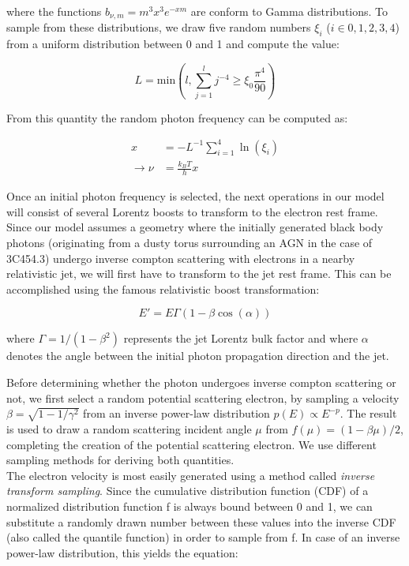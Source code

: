 \documentclass{article}
\begin{document}
        where the functions $b_{\nu,m} = m^3 x^3 e^{-xm}$ are conform to Gamma distributions. To sample from these distributions, we draw five random numbers $\xi_i$ ($i\in{0,1,2,3,4}$) from a uniform distribution between 0 and 1 and compute the value:
        
            \begin{equation}
                L = \mathrm{min}\left( l, \sum_{j=1}^l j^{-4} \geq \xi_0 \frac{\pi^4}{90}\right)
            \end{equation}
        
        From this quantity the random photon frequency can be computed as:

            \begin{align*}
                x &= -L^{-1} \sum_{i=1}^4 \ln(\xi_i) \\
                \longrightarrow \nu &= \frac{k_B T}{h} x
            \end{align*}

        Once an initial photon frequency is selected, the next operations in our model will consist of several Lorentz boosts to transform to the electron rest frame. Since our model assumes a geometry where the initially generated black body photons (originating from a dusty torus surrounding an AGN in the case of 3C454.3) undergo inverse compton scattering with electrons in a nearby relativistic jet, we will first have to transform to the jet rest frame. This can be accomplished using the famous relativistic boost transformation:
        
            \begin{equation}
                E' = E \Gamma (1 - \beta \cos(\alpha))
            \end{equation} \label{eq:transfE}

        where $\Gamma = 1/(1-\beta^2)$ represents the jet Lorentz bulk factor and where $\alpha$ denotes the angle between the initial photon propagation direction and the jet. 
        
        \par Before determining whether the photon undergoes inverse compton scattering or not, we first select a random potential scattering electron, by sampling a velocity $\beta = \sqrt{1 - 1/\gamma^2}$ from an inverse power-law distribution $p(E) \propto E^{-p}$. The result is used to draw a random scattering incident angle $\mu$ from $f(\mu) = (1 - \beta \mu) / 2$, completing the creation of the potential scattering electron. We use different sampling methods for deriving both quantities. \\
        The electron velocity is most easily generated using a method called \textit{inverse transform sampling}. Since the cumulative distribution function (CDF) of a normalized distribution function f is always bound between 0 and 1, we can substitute a randomly drawn number between these values into the inverse CDF (also called the quantile function) in order to sample from f. In case of an inverse power-law distribution, this yields the equation:
\end{document}
